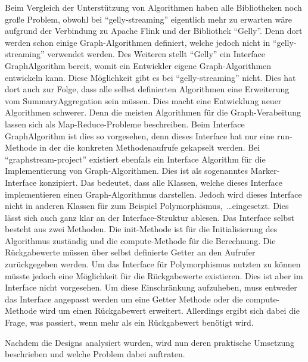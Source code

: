 Beim Vergleich der Unterstützung von Algorithmen haben alle Bibliotheken noch
große Problem, obwohl bei \enquote{gelly-streaming} eigentlich mehr zu erwarten
wäre aufgrund der Verbindung zu Apache Flink und der Bibliothek \enquote{Gelly}.
Denn dort werden schon einige Graph-Algorithmen definiert, welche jedoch nicht in
\enquote{gelly-streaming} verwendet werden. Des Weiteren stellt \enquote{Gelly}
ein Interface GraphAlgorithm bereit, womit ein Entwickler eigene Graph-Algorithmen
entwickeln kann. Diese Möglichkeit gibt es bei \enquote{gelly-streaming} nicht.
Dies hat dort auch zur Folge, dass alle selbst definierten Algorithmen eine
Erweiterung vom SummaryAggregation sein müssen. Dies macht eine Entwicklung
neuer Algorithmen schwerer. Denn die meisten Algorithmen für die
Graph-Verabeitung lassen sich als Map-Reduce-Probleme beschreiben. Beim Interface
GraphAlgorithm ist dies so vorgesehen, denn dieses Interface hat nur eine
run-Methode in der die konkreten Methodenaufrufe gekapselt werden. Bei
\enquote{graphstream-project} existiert ebenfals ein Interface Algorithm für die
Implementierung von Graph-Algorithmen. Dies ist als sogenanntes Marker-Interface
konzipiert. Das bedeutet, dass alle Klassen, welche dieses Interface
implementieren einen Graph-Algorithmus darstellen. Jedoch wird dieses Interface
nicht in anderen Klassen für zum Beispiel Polymorphismus,~\dots eingesetzt. Dies
lässt sich auch ganz klar an der Interface-Struktur ablesen. Das Interface selbst
besteht aus zwei Methoden. Die init-Methode ist für die Initialisierung des
Algorithmus zuständig und die compute-Methode für die Berechnung. Die Rückgabewerte
müssen über selbst definierte Getter an den Aufrufer zurückgegeben werden. Um
das Interface für Polymorphismus nutzten zu können müsste jedoch eine Möglichkeit
für die Rückgabewerte existieren. Dies ist aber im Interface nicht vorgesehen.
Um diese Einschränkung aufzuheben, muss entweder das Interface angepasst werden
um eine Getter Methode oder die compute-Methode wird um einen Rückgabewert
erweitert. Allerdings ergibt sich dabei die Frage, was passiert, wenn mehr als ein
Rückgabewert benötigt wird.

Nachdem die Designs analysiert wurden, wird nun deren praktische Umsetzung
beschrieben und welche Problem dabei auftraten.
